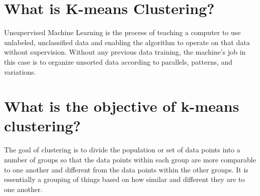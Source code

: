 \section{What is K-means Clustering?}
Unsupervised Machine Learning is the process of teaching a computer to use unlabeled, unclassified data and enabling the algorithm to operate on that data without supervision. Without any previous data training, the machine’s job in this case is to organize unsorted data according to parallels, patterns, and variations. 

\section{What is the objective of k-means clustering?}
The goal of clustering is to divide the population or set of data points into a number of groups so that the data points within each group are more comparable to one another and different from the data points within the other groups. It is essentially a grouping of things based on how similar and different they are to one another. 